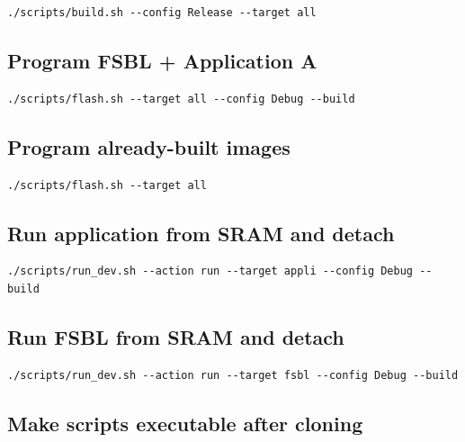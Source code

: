 \documentclass[10pt,a4paper,oneside]{report}
\begin{document}
\begin{verbatim}
./scripts/build.sh --config Release --target all
\end{verbatim}

\subsection{Program FSBL + Application A}\label{wiki-getting-started-build-flash-debug--program-fsbl--application-a}

\begin{verbatim}
./scripts/flash.sh --target all --config Debug --build
\end{verbatim}

\subsection{Program already-built images}\label{wiki-getting-started-build-flash-debug--program-already-built-images}

\begin{verbatim}
./scripts/flash.sh --target all
\end{verbatim}

\subsection{Run application from SRAM and detach}\label{wiki-getting-started-build-flash-debug--run-application-from-sram-and-detach}

\begin{verbatim}
./scripts/run_dev.sh --action run --target appli --config Debug --build
\end{verbatim}

\subsection{Run FSBL from SRAM and detach}\label{wiki-getting-started-build-flash-debug--run-fsbl-from-sram-and-detach}

\begin{verbatim}
./scripts/run_dev.sh --action run --target fsbl --config Debug --build
\end{verbatim}

\subsection{Make scripts executable after cloning}\label{wiki-getting-started-build-flash-debug--make-scripts-executable-after-cloning}
\end{document}
